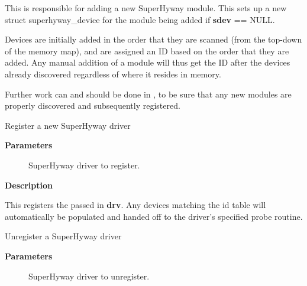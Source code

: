 \documentclass[a4paper,8pt,english]{sphinxmanual}
\begin{document}
This is responsible for adding a new SuperHyway module. This sets up a new
struct superhyway\_device for the module being added if \textbf{sdev} == NULL.

Devices are initially added in the order that they are scanned (from the
top-down of the memory map), and are assigned an ID based on the order that
they are added. Any manual addition of a module will thus get the ID after
the devices already discovered regardless of where it resides in memory.

Further work can and should be done in , to be sure
that any new modules are properly discovered and subsequently registered.

\begin{fulllineitems}
\label{sh/index:c.superhyway_register_driver}
Register a new SuperHyway driver

\end{fulllineitems}


\textbf{Parameters}
\begin{description}
\item[{}] \leavevmode
SuperHyway driver to register.

\end{description}

\textbf{Description}

This registers the passed in \textbf{drv}. Any devices matching the id table will
automatically be populated and handed off to the driver's specified probe
routine.

\begin{fulllineitems}
\label{sh/index:c.superhyway_unregister_driver}
Unregister a SuperHyway driver

\end{fulllineitems}


\textbf{Parameters}
\begin{description}
\item[{}] \leavevmode
SuperHyway driver to unregister.

\end{description}
\end{document}
